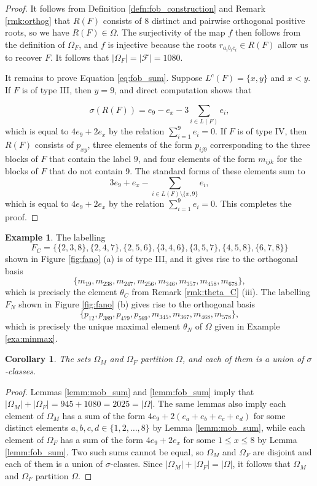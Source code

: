 \documentclass[11pt]{amsart}
\theoremstyle{plain}
\newtheorem{cor}[theorem]{Corollary}
\theoremstyle{definition}
\newtheorem{exa}[theorem]{Example}
\theoremstyle{remark}
\numberwithin{equation}{section}
\newcommand{\lc}{L^c}
\newcommand{\calf}{\mathcal{F}}
\newcommand{\ob}{\Omega}
\newcommand{\fob}{\Omega_F}
\newcommand{\mob}{\Omega_M}
\newcommand{\abs}[1]{\lvert #1 \rvert}
\begin{document}
\begin{proof}
It follows from Definition \ref{defn:fob_construction} and Remark
\ref{rmk:orthog} that $R(F)$ consists of 8 distinct and pairwise orthogonal
positive roots, so we have $R(F)\in \ob$. The surjectivity of the map $f$ then
follows from the definition of $\fob$, and $f$ is injective because the roots
$r_{a_ib_ic_i}\in R(F)$ allow us to recover $F$. It follows that
$\abs{\fob}=\abs{\calf}=1080.$

It remains to prove Equation \eqref{eq:fob_sum}. Suppose $\lc(F)=\{x,y\}$ and
$x<y$. If $F$ is of type III, then $y=9$, and direct computation shows that

\[
\sigma(R(F))=e_9-e_x-3\sum_{i\in L(F)}e_i,\] 
which is equal to $4e_9+2e_x$ by the relation $\sum_{i=1}^9e _i = 0$. If $F$ is of type
IV, then $R(F)$ consists of $p_{xy}$, three elements of the form $p_{ij9}$
corresponding to the three blocks of $F$ that contain the label $9$, and four
elements of the form $m_{ijk}$ for the blocks of $F$ that do not contain 9.
The standard forms of these elements sum to
\[
  3e_9+e_x-\sum_{i\in L(F)\setminus\{x,9\}}e_i,
  \]
which is equal to $4e_9+2e_x$ by the relation $\sum_{i=1}^9e _i = 0$. This
completes the proof.
\end{proof}

\begin{exa}
\label{exa:fob_exa}
The labelling 
\[
  F_C=\{\{2,3,8\},\{2,4,7\},\{2,5,6\},\{3,4,6\},\{3,5,7\}, \{4,5,8\},
\{6,7,8\}\}
\] 
shown in Figure \ref{fig:fano} (a) is of type III, and it
gives rise to the orthogonal basis 
\[
\{m_{19}, m_{238}, m_{247}, m_{256}, m_{346}, m_{357}, m_{458}, m_{678}\},
\]
which is precisely the element $\theta_C$ from Remark \ref{rmk:theta_C} (iii).
The labelling $F_N$ shown in Figure \ref{fig:fano} (b) gives rise to the orthogonal
basis
\[
\{p_{12}, p_{389}, p_{479}, p_{569}, m_{345}, m_{367}, m_{468}, m_{578}\},
\]
which is precisely the unique maximal element $\theta_N$ of $\ob$ given in Example
\ref{exa:minmax}. 
\end{exa}


\begin{cor}\label{cor:all}
The sets $\mob$ and $\fob$ partition $\ob$, and each of them is a union of
$\sigma$-classes.
\end{cor}

\begin{proof}
  Lemmas \ref{lemm:mob_sum} and \ref{lemm:fob_sum} imply that
  $\abs{\mob}+\abs{\fob}=945+1080=2025=\abs{\ob}$. The same lemmas also imply
  each element of $\mob$ has a sum of the form $4e_9+2(e_a+e_b+e_c+e_d)$ for
  some distinct elements $a,b,c,d\in \{1,2,\dots,8\}$ by Lemma
  \ref{lemm:mob_sum}, while each element of $\fob$ has a sum of the form
  $4e_9+2e_x$ for some $1\le x\le 8$ by Lemma \ref{lemm:fob_sum}. Two such sums
  cannot be equal, so $\mob$ and $\fob$ are disjoint and each of them is a union
  of $\sigma$-classes. Since $\abs{\mob}+\abs{\fob}=\abs{\ob}$, it follows that
$\mob$ and $\fob$ partition $\ob$. \end{proof}
\end{document}
